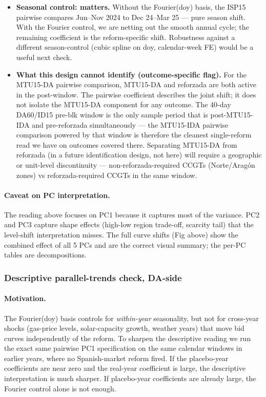 \documentclass[11pt,a4paper]{article}
\begin{document}
\begin{itemize}
\item \textbf{Seasonal control: matters.} Without the Fourier(doy) basis, the ISP15 pairwise compares Jun--Nov 2024 to Dec 24--Mar 25 --- pure season shift. With the Fourier control, we are netting out the smooth annual cycle; the remaining coefficient is the reform-specific shift. Robustness against a different season-control (cubic spline on doy, calendar-week FE) would be a useful next check.
\item \textbf{What this design cannot identify (outcome-specific flag).} For the MTU15-DA pairwise comparison, MTU15-DA and reforzada are both active in the post-window. The pairwise coefficient describes the joint shift; it does not isolate the MTU15-DA component for any outcome. The 40-day DA60/ID15 pre-blk window is the only sample period that is post-MTU15-IDA and pre-reforzada simultaneously --- the MTU15-IDA pairwise comparison powered by that window is therefore the cleanest single-reform read we have on outcomes covered there. Separating MTU15-DA from reforzada (in a future identification design, not here) will require a geographic or unit-level discontinuity --- non-reforzada-required CCGTs (Norte/Aragón zones) vs reforzada-required CCGTs in the same window.
\end{itemize}

\paragraph{Caveat on PC interpretation.} The reading above focuses on PC1 because it captures most of the variance. PC2 and PC3 capture shape effects (high-low region trade-off, scarcity tail) that the level-shift interpretation misses. The full curve shifts (Fig above) show the combined effect of all 5 PCs and are the correct visual summary; the per-PC tables are decompositions.

\subsubsection{Descriptive parallel-trends check, DA-side}\label{sec:prov:fpca_placebo}

\paragraph{Motivation.} The Fourier(doy) basis controls for \emph{within-year} seasonality, but not for cross-year shocks (gas-price levels, solar-capacity growth, weather years) that move bid curves independently of the reform. To sharpen the descriptive reading we run the exact same pairwise PC1 specification on the same calendar windows in earlier years, where no Spanish-market reform fired. If the placebo-year coefficients are near zero and the real-year coefficient is large, the descriptive interpretation is much sharper. If placebo-year coefficients are already large, the Fourier control alone is not enough.
\end{document}
